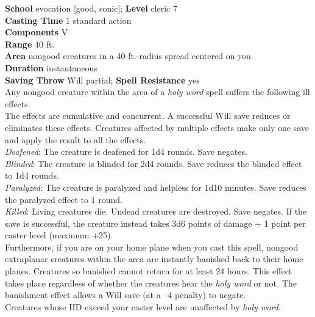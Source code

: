\textbf{School} evocation [good, sonic]; \textbf{Level} cleric 7\\
\textbf{Casting Time} 1 standard action\\
\textbf{Components} V\\
\textbf{Range} 40 ft.\\
\textbf{Area} nongood creatures in a 40-ft.-radius spread centered on you\\
\textbf{Duration} instantaneous\\
\textbf{Saving Throw} Will partial; \textbf{Spell Resistance} yes\\
Any nongood creature within the area of a \textit{holy word }spell suffers the following ill effects.\\
The effects are cumulative and concurrent. A successful Will save reduces or eliminates these effects. Creatures affected by multiple effects make only one save and apply the result to all the effects.\\
\textit{Deafened}: The creature is deafened for 1d4 rounds. Save negates.\\
\textit{Blinded}: The creature is blinded for 2d4 rounds. Save reduces the blinded effect to 1d4 rounds.\\
\textit{Paralyzed}: The creature is paralyzed and helpless for 1d10 minutes. Save reduces the paralyzed effect to 1 round.\\
\textit{Killed}: Living creatures die. Undead creatures are destroyed. Save negates. If the save is successful, the creature instead takes 3d6 points of damage + 1 point per caster level (maximum +25).\\
Furthermore, if you are on your home plane when you cast this spell, nongood extraplanar creatures within the area are instantly banished back to their home planes. Creatures so banished cannot return for at least 24 hours. This effect takes place regardless of whether the creatures hear the \textit{holy word} or not\textit{. }The banishment effect allows a Will save (at a –4 penalty) to negate.\\
Creatures whose HD exceed your caster level are unaffected by \textit{holy word.}\\
